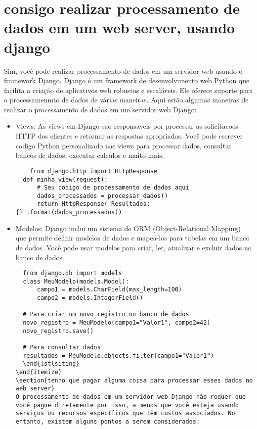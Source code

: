 \documentclass[16pts]{article}
\date{} %
\title{}
\begin{document}
\maketitle
\section{consigo realizar processamento de dados em um web server, usando django}
Sim, você pode realizar processamento de dados em um servidor web usando o framework Django. Django é um framework de desenvolvimento web Python que facilita a criação de aplicativos web robustos e escaláveis. Ele oferece suporte para o processamenmto de dados de várias maneiras. Aqui estão algumas maneiras de realizar o processamento de dados em um servidor web Django:
\begin{itemize}
  \item Views: As views em Django sao responsaveis por processar as solicitacoes HTTP dos clientes e retornar as respostas apropriadas. Você pode escrever codigo Python personalizado nas views para processar dados, consultar bancos de dados, executar calculos e muito mais.
  \begin{lstlisting}
    from django.http import HttpResponse
  def minha_view(request):
      # Seu codigo de processamento de dados aqui
      dados_processados = processar_dados()
      return HttpResponse("Resultados: {}".format(dados_processados))
  \end{lstlisting}    
  \item Modelos: Django inclui um sistema de ORM (Object-Relational Mapping) que permite definir modelos de dados e mapeá-los para tabelas em um banco de dados. Você pode usar modelos para criar, ler, atualizar e excluir dados no banco de dados.
  \begin{lstlisting}
  from django.db import models
  class MeuModelo(models.Model):
      campo1 = models.CharField(max_length=100)
      campo2 = models.IntegerField()

  # Para criar um novo registro no banco de dados
  novo_registro = MeuModelo(campo1="Valor1", campo2=42)
  novo_registro.save()

  # Para consultar dados
  resultados = MeuModelo.objects.filter(campo1="Valor1")
  \end{lstlsiting}
\end{itemize} 
\section{tenho que pagar alguma coisa para processar esses dados no web server}
O processamento de dados em um servidor web Django não requer que você pague diretamente por isso, a menos que você esteja usando serviços ou recursos específicos que têm custos associados. No entanto, existem alguns pontos a serem considerados:


\end{lstlisting}
\end{itemize}
\end{document}
